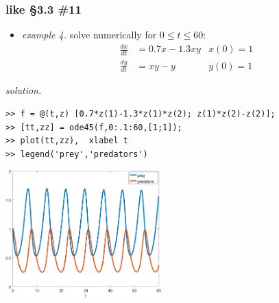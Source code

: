 \documentclass[dvipsnames,colorlinks]{beamer}
\begin{document}
\begin{frame}[fragile]
\frametitle{like \S3.3 \#11}

\begin{itemize}
\item \emph{example 4.}  solve numerically for $0\le t\le 60$:
\begin{align*}
\frac{dx}{dt} &= 0.7 x - 1.3 xy & x(0)=1\\
\frac{dy}{dt} &= xy - y  & y(0)=1
\end{align*}
\end{itemize}

\vspace{-2mm}
\noindent \emph{solution.}
\begin{Verbatim}[fontsize=\small]
>> f = @(t,z) [0.7*z(1)-1.3*z(1)*z(2); z(1)*z(2)-z(2)];
>> [tt,zz] = ode45(f,0:.1:60,[1;1]);
>> plot(tt,zz),  xlabel t
>> legend('prey','predators')
\end{Verbatim}


\vspace{-7mm}
\hfill \includegraphics[width=0.45\textwidth]{figs/lotka-time}
\end{frame}
\end{document}
